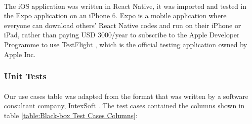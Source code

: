 \documentclass[12pt,a4paper]{article}
\begin{document}
          \paragraph{} The iOS application was written in React Native, it was imported and tested in the Expo \cite{Expo} application on an iPhone 6. Expo is a mobile application where everyone can download others' React Native codes and run on their iPhone or iPad, rather than paying USD 3000/year to subscribe to the Apple Developer Programme to use TestFlight \cite{TestFlight}, which is the official testing application owned by Apple Inc. 
        
        \subsubsection{Unit Tests} %
          \paragraph{}Our use cases table was adapted from the format that was written by a software consultant company, IntexSoft \cite{UseCaseTestingReference}. The test cases contained the columns shown in table \ref{table:Black-box Test Cases Columns}: 
\end{document}
